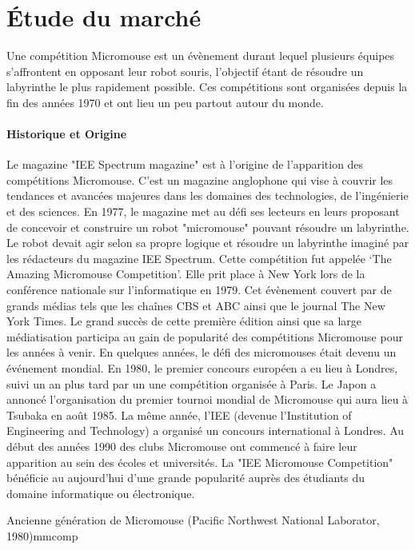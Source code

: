\section{Étude du marché} \label{sec:etudeMarche}
Une compétition Micromouse est un évènement durant lequel plusieurs équipes
s'affrontent en opposant leur robot souris, l'objectif étant de résoudre un
labyrinthe le plus rapidement possible.  Ces compétitions sont organisées
depuis la fin des années 1970 et ont lieu un peu partout autour du monde.

\paragraph{Historique et Origine}
Le magazine "IEE Spectrum magazine" est à l'origine de l'apparition des
compétitions Micromouse. C'est un magazine anglophone qui vise à couvrir les
tendances et avancées majeures dans les domaines des technologies, de
l'ingénierie et des sciences. En 1977, le magazine met au défi ses lecteurs en
leurs proposant de concevoir et construire un robot "micromouse" pouvant
résoudre un labyrinthe. Le robot devait agir selon sa propre logique et
résoudre un labyrinthe imaginé par les rédacteurs du magazine IEE Spectrum.
Cette compétition fut appelée ‘The Amazing Micromouse Competition’. Elle prit
place à New York lors de la conférence nationale sur l'informatique en 1979.
Cet évènement couvert par de grands médias tels que les chaînes CBS et ABC
ainsi que le journal The New York Times.  Le grand succès de cette première
édition ainsi que sa large médiatisation participa au gain de popularité des
compétitions Micromouse pour les années à venir.  En quelques années, le défi des
micromouses était devenu un événement mondial. En 1980, le premier concours
européen a eu lieu à Londres, suivi un an plus tard par un une compétition
organisée à Paris. Le Japon a annoncé l'organisation du premier tournoi mondial
de Micromouse qui aura lieu à Tsubaka en août 1985. La même année, l'IEE
(devenue l'Institution of Engineering and Technology) a organisé un concours
international à Londres.  Au début des années 1990 des clubs Micromouse ont
commencé à faire leur apparition au sein des écoles et universités. La "IEE
Micromouse Competition" bénéficie au aujourd'hui d'une grande
popularité auprès des étudiants du domaine informatique ou électronique.
\newpage
    
{Ancienne génération de Micromouse (Pacific Northwest National Laborator, 1980)}{mmcomp}

